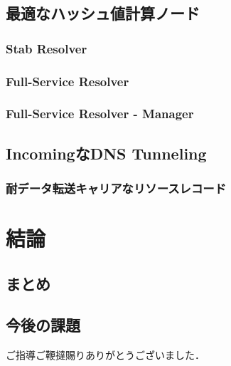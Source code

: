 \documentclass[12pt]{jarticle} %
\begin{document}
\subsection{最適なハッシュ値計算ノード}
\subsubsection{Stab Resolver}
\subsubsection{Full-Service Resolver}
\subsubsection{Full-Service Resolver - Manager}
\subsection{IncomingなDNS Tunneling}
\subsubsection{耐データ転送キャリアなリソースレコード}

\newpage
\section{結論}
\subsection{まとめ}
\subsection{今後の課題}


\newpage
\acknowledgements
ご指導ご鞭撻賜りありがとうございました．
\end{document}
